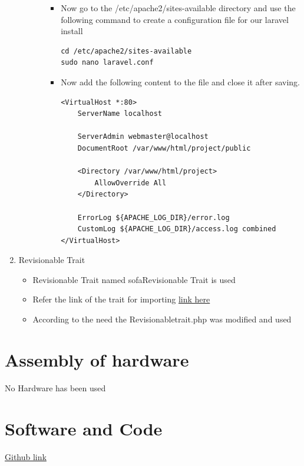 \documentclass[a4paper,12pt,oneside]{book}
\begin{document}
\begin{enumerate}
\begin{itemize}
\begin{enumerate}
\begin{itemize}
							\item Now go to the /etc/apache2/sites-available directory and use the following command to create a configuration file for our laravel install 
							    \begin{verbatim}
cd /etc/apache2/sites-available
sudo nano laravel.conf
							    \end{verbatim}
							
							\item Now add the following content to the file and close it after saving.\begin{verbatim}
<VirtualHost *:80>
    ServerName localhost

    ServerAdmin webmaster@localhost
    DocumentRoot /var/www/html/project/public

    <Directory /var/www/html/project>
        AllowOverride All
    </Directory>

    ErrorLog ${APACHE_LOG_DIR}/error.log
    CustomLog ${APACHE_LOG_DIR}/access.log combined
</VirtualHost>
							      \end{verbatim}
  						\end{itemize}
  						
				\end{enumerate}  				 
  
  		\end{itemize}
  		
    \item Revisionable Trait
        \begin{itemize}
            \item Revisionable Trait named sofaRevisionable Trait is used
            \item Refer the link of the trait for importing
                {\href{https://github.com/jarektkaczyk/revisionable}{link here}}
            \item According to the need the Revisionabletrait.php was modified and used
        \end{itemize} 
\end{enumerate}

\vspace{2in}

\section{Assembly of hardware}
No Hardware has been used

\section{Software and Code}
\href{http://www.github.com}{Github link}
\end{document}
